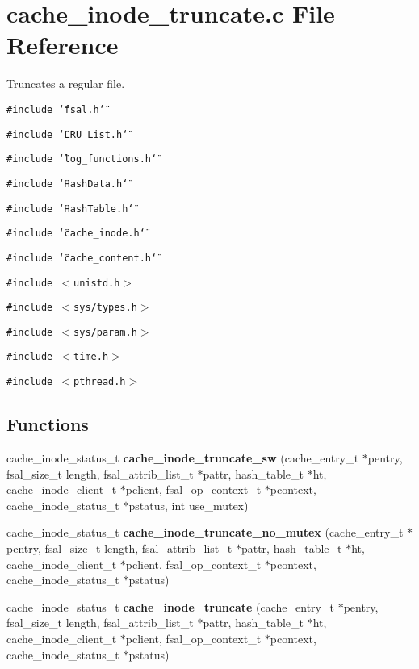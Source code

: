 \section{cache\_\-inode\_\-truncate.c File Reference}
\label{cache__inode__truncate_8c}
Truncates a regular file. 

{\tt \#include \char`\"{}fsal.h\char`\"{}}\par
{\tt \#include \char`\"{}LRU\_\-List.h\char`\"{}}\par
{\tt \#include \char`\"{}log\_\-functions.h\char`\"{}}\par
{\tt \#include \char`\"{}Hash\-Data.h\char`\"{}}\par
{\tt \#include \char`\"{}Hash\-Table.h\char`\"{}}\par
{\tt \#include \char`\"{}cache\_\-inode.h\char`\"{}}\par
{\tt \#include \char`\"{}cache\_\-content.h\char`\"{}}\par
{\tt \#include $<$unistd.h$>$}\par
{\tt \#include $<$sys/types.h$>$}\par
{\tt \#include $<$sys/param.h$>$}\par
{\tt \#include $<$time.h$>$}\par
{\tt \#include $<$pthread.h$>$}\par
\subsection*{Functions}
\begin{CompactItemize}
\item 
cache\_\-inode\_\-status\_\-t {\bf cache\_\-inode\_\-truncate\_\-sw} (cache\_\-entry\_\-t $\ast$pentry, fsal\_\-size\_\-t length, fsal\_\-attrib\_\-list\_\-t $\ast$pattr, hash\_\-table\_\-t $\ast$ht, cache\_\-inode\_\-client\_\-t $\ast$pclient, fsal\_\-op\_\-context\_\-t $\ast$pcontext, cache\_\-inode\_\-status\_\-t $\ast$pstatus, int use\_\-mutex)
\item 
cache\_\-inode\_\-status\_\-t {\bf cache\_\-inode\_\-truncate\_\-no\_\-mutex} (cache\_\-entry\_\-t $\ast$pentry, fsal\_\-size\_\-t length, fsal\_\-attrib\_\-list\_\-t $\ast$pattr, hash\_\-table\_\-t $\ast$ht, cache\_\-inode\_\-client\_\-t $\ast$pclient, fsal\_\-op\_\-context\_\-t $\ast$pcontext, cache\_\-inode\_\-status\_\-t $\ast$pstatus)
\item 
cache\_\-inode\_\-status\_\-t {\bf cache\_\-inode\_\-truncate} (cache\_\-entry\_\-t $\ast$pentry, fsal\_\-size\_\-t length, fsal\_\-attrib\_\-list\_\-t $\ast$pattr, hash\_\-table\_\-t $\ast$ht, cache\_\-inode\_\-client\_\-t $\ast$pclient, fsal\_\-op\_\-context\_\-t $\ast$pcontext, cache\_\-inode\_\-status\_\-t $\ast$pstatus)
\end{CompactItemize}


